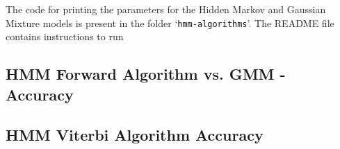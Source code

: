 \documentclass[parskip=half]{scrartcl}
\begin{document}
        The code for printing the parameters for the Hidden Markov and Gaussian Mixture models is present in the folder `\texttt{hmm-algorithms}'. The README file contains instructions to run 
    


    \subsection{HMM Forward Algorithm vs. GMM - Accuracy} %
    \label{sub:hmm_forward_algorithm_vs_gmm_accuracy}
    


    \subsection{HMM Viterbi Algorithm Accuracy} %
    \label{sub:hmm_viterbi_algorithm_accuracy}
    

\end{document}
